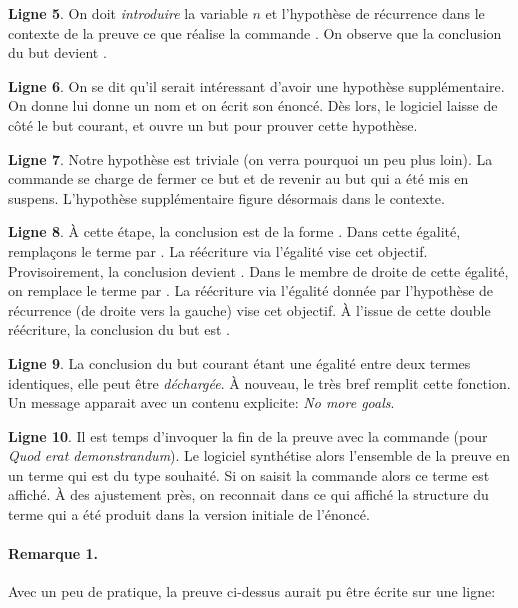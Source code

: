 \documentclass[a4paper,10pt]{article}
\begin{document}
\textbf{Ligne 5}.  On doit \emph{introduire} la variable \(n\) et l'hypothèse de récurrence  dans le contexte
de la preuve ce que réalise la commande .  On observe que la conclusion du but devient
.

\textbf{Ligne 6}.  On se dit qu'il serait intéressant d'avoir une hypothèse supplémentaire.  On donne lui donne un
nom et on écrit son énoncé.  Dès lors, le logiciel laisse de côté le but courant, et ouvre un but pour
prouver cette hypothèse.

\textbf{Ligne 7}.  Notre hypothèse est triviale (on verra pourquoi un peu plus loin).  La commande  se
charge de fermer ce but et de revenir au but qui a été mis en suspens.  L'hypothèse supplémentaire figure
désormais dans le contexte.

\textbf{Ligne 8}.  À cette étape, la conclusion est de la forme .  Dans cette égalité,
remplaçons le terme  par .  La réécriture via l'égalité  vise cet
objectif.  Provisoirement, la conclusion devient .  Dans le membre de droite de cette
égalité, on remplace le terme  par .  La réécriture via l'égalité donnée par l'hypothèse de
récurrence (de droite vers la gauche) vise cet objectif.  À l'issue de cette double réécriture, la
conclusion du but est .

\textbf{Ligne 9}.  La conclusion du but courant étant une égalité entre deux termes identiques, elle peut être
\emph{déchargée}.  À nouveau, le très bref  remplit cette fonction.  Un message apparait avec un contenu
explicite: \emph{No more goals}.

\textbf{Ligne 10}.  Il est temps d'invoquer la fin de la preuve avec la commande  (pour \emph{Quod erat
demonstrandum}).  Le logiciel synthétise alors l'ensemble de la preuve en un terme qui est du type souhaité.
Si on saisit la commande  alors ce terme est affiché.  À des
ajustement près, on reconnait dans ce qui affiché la structure du terme qui a été produit dans la version
initiale de l'énoncé.

\paragraph*{Remarque 1.}
\label{sec:org648d147}
Avec un peu de pratique, la preuve ci-dessus aurait pu être écrite sur une ligne:
\end{document}
